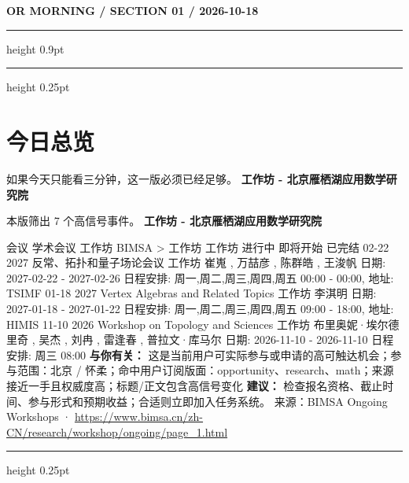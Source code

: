 \documentclass[10.5pt]{ctexart}
\begin{document}
{\small\bfseries OR MORNING / SECTION 01 / 2026-10-18}
\vspace{2mm}
\hrule height 0.9pt
\vspace{1.5mm}
\hrule height 0.25pt
\vspace{4mm}
\section*{今日总览}
{\color{ormuted} 如果今天只能看三分钟，这一版必须已经足够。}
\vspace{2mm}
{\fontsize{25}{29}\selectfont\bfseries 工作坊 - 北京雁栖湖应用数学研究院}\par
\vspace{2mm}
{\large 本版筛出 7 个高信号事件。}
\vspace{3mm}
{\Large\bfseries 工作坊 - 北京雁栖湖应用数学研究院}\par
会议 学术会议 工作坊 BIMSA > 工作坊 工作坊 进行中 即将开始 已完结 02-22 2027 反常、拓扑和量子场论会议 工作坊 崔嵬 , 万喆彦 , 陈群皓 , 王浚帆 日期: 2027-02-22 - 2027-02-26 日程安排: 周一,周二,周三,周四,周五 00:00 - 00:00, 地址: TSIMF 01-18 2027 Vertex Algebras and Related Topics 工作坊 李淇明 日期: 2027-01-18 - 2027-01-22 日程安排: 周一,周二,周三,周四,周五 09:00 - 18:00, 地址: HIMIS 11-10 2026 Workshop on Topology and Sciences 工作坊 布里奥妮·埃尔德里奇 , 吴杰 , 刘冉 , 雷逢春 , 普拉文·库马尔 日期: 2026-11-10 - 2026-11-10 日程安排: 周三 08:00
\textbf{与你有关：} 这是当前用户可实际参与或申请的高可触达机会；参与范围：北京 / 怀柔；命中用户订阅版面：opportunity、research、math；来源接近一手且权威度高；标题/正文包含高信号变化
\textbf{建议：} 检查报名资格、截止时间、参与形式和预期收益；合适则立即加入任务系统。
{\footnotesize\color{ormuted} 来源：BIMSA Ongoing Workshops · \url{https://www.bimsa.cn/zh-CN/research/workshop/ongoing/page_1.html}}
\vspace{3mm}
\hrule height 0.25pt
\vspace{3mm}
\end{document}
